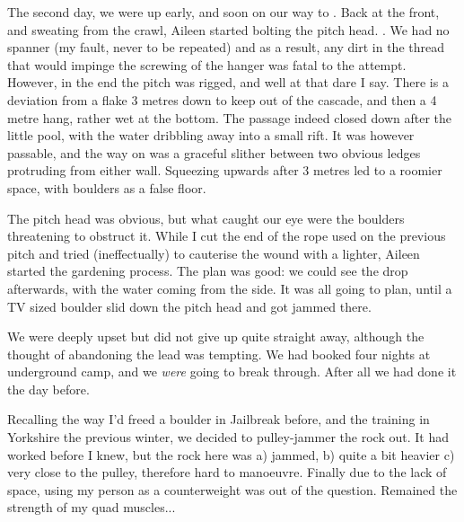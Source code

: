 The second day, we were up early, and soon on our way to . Back at the front, and sweating from the crawl, Aileen started bolting the pitch head. . We had no spanner (my fault, never to be repeated) and as a result, any dirt in the thread that would impinge the screwing of the hanger was fatal to the attempt. However, in the end the pitch was rigged, and well at that dare I say. There is a deviation from a flake 3 metres down to keep out of the cascade, and then a 4 metre hang, rather wet at the bottom. The passage indeed closed down after the little pool, with the water dribbling away into a small rift. It was however passable, and the way on was a graceful slither between two obvious ledges protruding from either wall. Squeezing upwards after 3 metres led to a roomier space, with boulders as a false floor.

The pitch head was obvious, but what caught our eye were the boulders threatening to obstruct it. While I cut the end of the rope used on the previous pitch and tried (ineffectually) to cauterise the wound with a lighter, Aileen started the gardening process. The plan was good: we could see the drop afterwards, with the water coming from the side. It was all going to plan, until a TV sized boulder slid down the pitch head and got jammed there. 

We were deeply upset but did not give up quite straight away, although the thought of abandoning the lead  was tempting.  We had booked four nights at underground camp, and we \emph{were} going to break through. After all we had done it the day before.

Recalling the way I'd freed a boulder in Jailbreak before, and the training in Yorkshire the previous winter, we decided to pulley-jammer the rock out. It had worked before I knew, but the rock here was a) jammed, b) quite a bit heavier c) very close to the pulley, therefore hard to manoeuvre. Finally due to the lack of space, using my person as a counterweight was out of the question. Remained the strength of my quad muscles...

